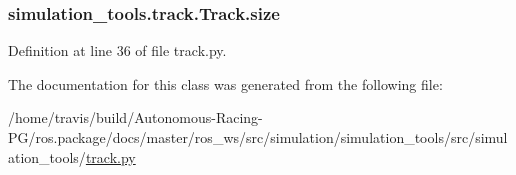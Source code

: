 \subsubsection[{\texorpdfstring{size}{size}}]{\setlength{\rightskip}{0pt plus 5cm}simulation\+\_\+tools.\+track.\+Track.\+size}\hypertarget{classsimulation__tools_1_1track_1_1_track_a69be8807eecacfd98981e206ea3a003f}{}\label{classsimulation__tools_1_1track_1_1_track_a69be8807eecacfd98981e206ea3a003f}


Definition at line 36 of file track.\+py.



The documentation for this class was generated from the following file\+:\begin{DoxyCompactItemize}
\item 
/home/travis/build/\+Autonomous-\/\+Racing-\/\+P\+G/ros.\+package/docs/master/ros\+\_\+ws/src/simulation/simulation\+\_\+tools/src/simulation\+\_\+tools/\hyperlink{track_8py}{track.\+py}\end{DoxyCompactItemize}
